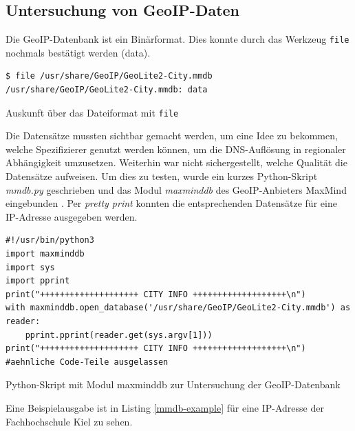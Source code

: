 \subsection{Untersuchung von GeoIP-Daten}
Die \gls{GeoIP}-Datenbank ist ein Binärformat\cite{maxmind2021binary}. Dies konnte durch das Werkzeug \texttt{file} nochmals bestätigt werden (\glqq data\grqq{})\cite{filemanpage2021}.
\begin{listing}[h]
\begin{verbatim}
$ file /usr/share/GeoIP/GeoLite2-City.mmdb
/usr/share/GeoIP/GeoLite2-City.mmdb: data

\end{verbatim}
\caption{Auskunft über das Dateiformat mit \texttt{file}}
\label{file-geoip-db}
\end{listing}\FloatBarrier
Die Datensätze mussten \glqq sichtbar\grqq{} gemacht werden, um eine Idee zu bekommen, welche Spezifizierer genutzt werden können, um die \gls{DNS}-Auflösung in regionaler Abhängigkeit umzusetzen. Weiterhin war nicht sichergestellt, welche Qualität die Datensätze aufweisen. Um dies zu testen, wurde ein kurzes Python-Skript \textit{mmdb.py} geschrieben und das Modul \textit{maxminddb} des \gls{GeoIP}-Anbieters MaxMind eingebunden \cite{maxminddbreader2021}. Per \textit{pretty print} konnten die entsprechenden Datensätze für eine IP-Adresse ausgegeben werden.
\begin{listing}[h]
\begin{verbatim}
#!/usr/bin/python3
import maxminddb
import sys
import pprint
print("++++++++++++++++++++ CITY INFO +++++++++++++++++++\n")
with maxminddb.open_database('/usr/share/GeoIP/GeoLite2-City.mmdb') as reader:
    pprint.pprint(reader.get(sys.argv[1]))
print("++++++++++++++++++++ CITY INFO +++++++++++++++++++\n")
#aehnliche Code-Teile ausgelassen
\end{verbatim}
\caption{Python-Skript mit Modul maxminddb zur Untersuchung der GeoIP-Datenbank}
\label{python-mmdb-reader}
\end{listing}\FloatBarrier
\newpage
Eine Beispielausgabe ist in Listing \ref{mmdb-example} für eine IP-Adresse der Fachhochschule Kiel zu sehen.
